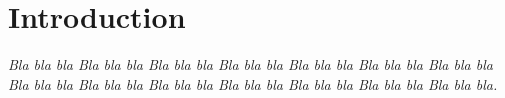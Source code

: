 
\chapter*{Introduction}\label{intro}

\textit{Bla bla bla Bla bla bla Bla bla bla Bla bla bla Bla bla bla Bla bla bla Bla bla bla Bla bla bla Bla bla bla Bla bla bla Bla bla bla Bla bla bla Bla bla bla Bla bla bla.}